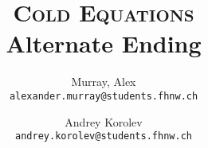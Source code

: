 \author{
    Murray, Alex\\
    \texttt{alexander.murray@students.fhnw.ch}
    \and
    Andrey Korolev\\
    \texttt{andrey.korolev@students.fhnw.ch}
}

\title{
    \vspace{20mm}
    \Huge{\textsc{Cold Equations}}
    \\
    \vspace{5mm}
    \Large{Alternate Ending}
}
